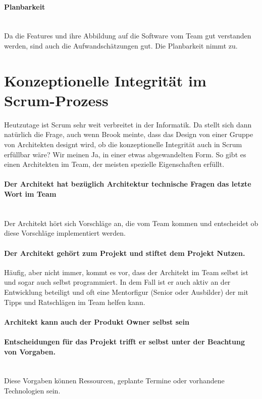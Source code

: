 \documentclass[a4paper, ngerman, 12pt, usenames, dvipsnames]{article}
\begin{document}
\paragraph{Planbarkeit}\mbox{} \\
Da die Features und ihre Abbildung auf die Software vom Team gut verstanden werden, sind auch die Aufwandschätzungen gut. Die Planbarkeit nimmt zu.

\section{Konzeptionelle Integrität im Scrum-Prozess}
Heutzutage ist Scrum sehr weit verbreitet in der Informatik. Da stellt sich dann natürlich die Frage, auch wenn Brook meinte, dass das Design von einer Gruppe von Architekten designt wird,
ob die konzeptionelle Integrität auch in Scrum erfüllbar wäre? Wir meinen Ja, in einer etwas abgewandelten Form. So gibt es einen Architekten im Team, der meisten spezielle Eigenschaften erfüllt.

    \paragraph{Der Architekt hat bezüglich Architektur technische Fragen das letzte Wort im Team}\mbox{} \\
    Der Architekt hört sich Vorschläge an, die vom Team kommen und entscheidet ob diese Vorschläge implementiert werden.
    \paragraph{Der Architekt gehört zum Projekt und stiftet dem Projekt Nutzen.}\mbox{} 
    Häufig, aber nicht immer, kommt es vor, dass der Architekt im Team selbst ist und sogar auch selbst programmiert.
    In dem Fall ist er auch aktiv an der Entwicklung beteiligt und oft eine Mentorfigur (Senior oder Ausbilder) der mit Tipps und Ratschlägen im Team helfen kann.
    \paragraph{Architekt kann auch der Produkt Owner selbst sein}\mbox{} 
    \paragraph{Entscheidungen für das Projekt trifft er selbst unter der Beachtung von Vorgaben.}\mbox{} \\
    Diese Vorgaben können Ressourcen, geplante Termine oder vorhandene Technologien sein.\\
\end{document}
